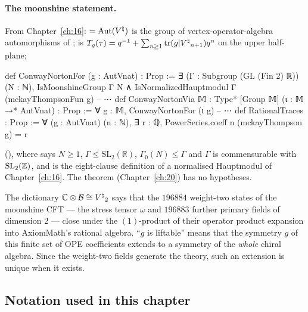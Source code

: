 \paragraph{The moonshine statement.}  From Chapter~\ref{ch:16}:  $=\operatorname{Aut}({V^{\natural}})$ is the group of
vertex-operator-algebra automorphisms of ;  is
$T_g(\tau)=q^{-1}+\sum_{n\ge1}\operatorname{tr}(g|{V^{\natural}}_{n+1})q^n$ on the upper half-plane;
\begin{leancode}
def ConwayNortonFor (g : AutVnat) : Prop :=
  ∃ (Γ : Subgroup (GL (Fin 2) ℝ)) (N : ℕ), IsMoonshineGroup Γ N ∧
    IsNormalizedHauptmodul Γ (mckayThompsonFun g)
-- ⋯
def ConwayNortonVia {𝕄 : Type*} [Group 𝕄] (ι : 𝕄 →* AutVnat) : Prop :=
  ∀ g : 𝕄, ConwayNortonFor (ι g)
-- ⋯
def RationalTraces : Prop :=
  ∀ (g : AutVnat) (n : ℕ), ∃ r : ℚ, PowerSeries.coeff n (mckayThompson g) = r
\end{leancode}
(), where  says $N\ge1$,
$\Gamma\le\mathrm{SL}_2(\mathbb{R})$, $\Gamma_0(N)\le\Gamma$ and $\Gamma$ is commensurable with $\mathrm{SL}_2({\mathbb{Z}})$, and
 is the eight-clause definition of a normalised Hauptmodul of
Chapter~\ref{ch:16}.  The theorem  (Chapter~\ref{ch:20})
has no hypotheses.

\begin{physics}
The dictionary ${\mathbb{C}}\otimes\mathcal{B}\cong{V^{\natural}}_2$ says that the $196884$ weight-two states of the moonshine CFT
--- the stress tensor $\omega$ and $196883$ further primary fields of dimension $2$ --- close under the
$(1)$-product of their operator product expansion into AxiomMath's rational algebra.  ``$g$ is liftable'' means
that the symmetry $g$ of this finite set of OPE coefficients extends to a symmetry of the \emph{whole} chiral
algebra.  Since the weight-two fields generate the theory, such an extension is unique when it exists.
\end{physics}

\subsection{Notation used in this chapter}\label{ch22:sec:notation}

